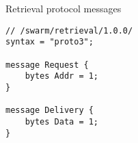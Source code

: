 \begin{definition}{Retrieval protocol messages}\label{def:retrieval-messages}

\begin{lstlisting}[]
// /swarm/retrieval/1.0.0/
syntax = "proto3";

message Request {
    bytes Addr = 1;
}

message Delivery {
    bytes Data = 1;
}

\end{lstlisting}
\end{definition}







